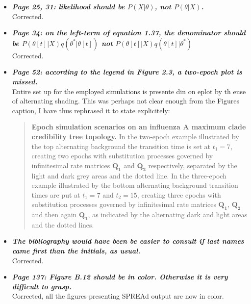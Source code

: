 \documentclass[english]{article}
\begin{document}
\begin{itemize}
\begin{quote}
\myeditDPfive
\end{quote}


\item {
{\it
\textbf{
Page 25, 31: likelihood should be $P(X| \theta)$, not $P(\theta | X)$.
}%
}%
}%
\\
Corrected.


\item {
{\it
\textbf{
Page 34: on the left-term of equation 1.37, the denominator should be
$P(\theta[t]|X) q(\theta^{*} | \theta[t])$
not 
$P(\theta[t]|X) q(\theta[t] | \theta^{*})$
}%
}%
}%
\\
Corrected.


\item {
{\it
\textbf{
Page 52: according to the legend in Figure 2.3, a two-epoch plot is missed.
}%
}%
}%
\\
Entire set up for the employed simulations is presente din on eplot by th euse of alternating shading. 
This was perhaps not clear enough from the Figures caption, I have thus rephrased it to state explicitely:

\begin{quote}
{\bf  Epoch simulation scenarios on an influenza A maximum clade credibility tree topology.} 
In the two-epoch example illustrated by the top alternating background
the transition time is set at $t_{1}=7$, creating two epochs with substitution processes governed by infinitesimal rate matrices $\mathbf{Q_{1}}$ and $\mathbf{Q_{2}}$ respectively, separated by the light and dark grey areas and the dotted line.
In the three-epoch example illustrated 
by the bottom alternating background
transition times are put at $t_{1}=7$ and $t_{2}=15$, creating three epochs with substitution processes governed by infinitesimal rate matrices $\mathbf{Q_{1}}$, $\mathbf{Q_{2}}$ and then again $\mathbf{Q_{1}}$, as indicated by the alternating dark and light areas and the dotted lines.
\end{quote}



\item {
{\it
\textbf{
The bibliography would have been be easier to consult if last names came first than the initials, as usual.
}%
}%
}%
\\
Corrected.


\item {
{\it
\textbf{
Page 137: Figure B.12 should be in color. 
Otherwise it is very difficult to grasp.
}%
}%
}%
\\
Corrected, all the figures presenting SPREAd output are now in color.


\end{itemize}
\end{document}
